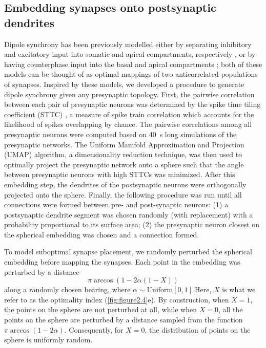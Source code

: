 \subsection{Embedding synapses onto postsynaptic dendrites}
Dipole synchrony has been previously modelled either by separating inhibitory and excitatory input into somatic and apical compartments, respectively \cite{Nunez2006}, or by having counterphase input into the basal and apical compartments \cite{Jones2009, Studenova2022}; both of these models can be thought of as optimal mappings of two anticorrelated populations of synapses. Inspired by these models, we developed a procedure to generate dipole synchrony given any presynaptic topology. First, the pairwise correlation between each pair of presynaptic neurons was determined by the spike time tiling coefficient (STTC) \cite{Cutts2014}, a measure of spike train correlation which accounts for the likelihood of spikes overlapping by chance. The pairwise correlations among all presynaptic neurons were computed based on \qty{40}{\second} long simulations of the presynaptic networks. The Uniform Manifold Approximation and Projection (UMAP) algorithm, a dimensionality reduction technique\cite{McInnes2018}, was then used to optimally project the presynaptic network onto a sphere such that the angle between presynaptic neurons with high STTCs was minimized. After this embedding step, the dendrites of the postsynaptic neurons were orthogonally projected onto the sphere. Finally, the following procedure was run until all connections were formed between pre- and post-synaptic neurons: (1) a postsynaptic dendrite segment was chosen randomly (with replacement) with a probability proportional to its surface area; (2) the presynaptic neuron closest on the spherical embedding was chosen and a connection formed.

To model suboptimal synapse placement, we randomly perturbed the spherical embedding before mapping the synapses. Each point in the embedding was perturbed by a distance \[\pi\arccos {(1-2\alpha\left(1-X\right))}\] along a randomly chosen bearing, where $\alpha\sim \mathrm{Uniform}[0,1]$.Here, $X$ is what we refer to as the optimality index (\autoref{fig:figure2.4}e). By construction, when $X=1$, the points on the sphere are not perturbed at all, while when $X=0$, all the points on the sphere are perturbed by a distance sampled from the function $\pi\arccos{(1-2\alpha)}$. Consequently, for $X=0$, the distribution of points on the sphere is uniformly random.

